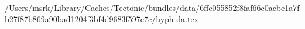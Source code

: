 /Users/msrk/Library/Caches/Tectonic/bundles/data/6ffe055852f8faf66c0acbe1a7fb27f87b869a90bad1204f3bf4d9683f597c7c/hyph-da.tex
